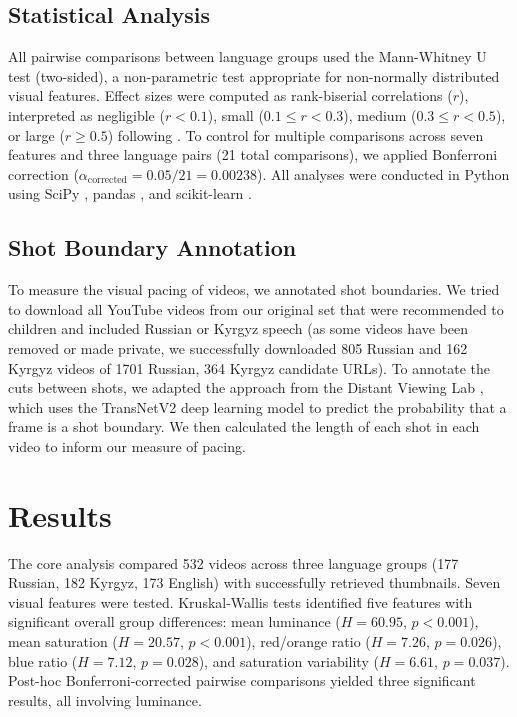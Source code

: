 \documentclass[12pt, letterpaper]{article}
\begin{document}
\subsection{Statistical Analysis}

All pairwise comparisons between language groups used the Mann-Whitney U test (two-sided), a non-parametric test appropriate for non-normally distributed visual features. Effect sizes were computed as rank-biserial correlations ($r$), interpreted as negligible ($r < 0.1$), small ($0.1 \leq r < 0.3$), medium ($0.3 \leq r < 0.5$), or large ($r \geq 0.5$) following \citet{cohen1988}. To control for multiple comparisons across seven features and three language pairs (21 total comparisons), we applied Bonferroni correction ($\alpha_{\text{corrected}} = 0.05 / 21 = 0.00238$). All analyses were conducted in Python using SciPy \citep{scipy}, pandas \citep{pandas}, and scikit-learn \citep{sklearn}.

\subsection{Shot Boundary Annotation}

To measure the visual pacing of videos, we annotated shot boundaries. We tried to download all YouTube videos from our original set that were recommended to children and included Russian or Kyrgyz speech (as some videos have been removed or made private, we successfully downloaded 805 Russian and 162 Kyrgyz videos of 1701 Russian, 364 Kyrgyz candidate URLs). To annotate the cuts between shots, we adapted the approach from the Distant Viewing Lab \citep{arnold2025}, which uses the TransNetV2 deep learning model to predict the probability that a frame is a shot boundary. We then calculated the length of each shot in each video to inform our measure of pacing.

\section{Results}

The core analysis compared 532 videos across three language groups (177 Russian, 182 Kyrgyz, 173 English) with successfully retrieved thumbnails. Seven visual features were tested. Kruskal-Wallis tests identified five features with significant overall group differences: mean luminance ($H = 60.95$, $p < 0.001$), mean saturation ($H = 20.57$, $p < 0.001$), red/orange ratio ($H = 7.26$, $p = 0.026$), blue ratio ($H = 7.12$, $p = 0.028$), and saturation variability ($H = 6.61$, $p = 0.037$). Post-hoc Bonferroni-corrected pairwise comparisons yielded three significant results, all involving luminance.
\end{document}
